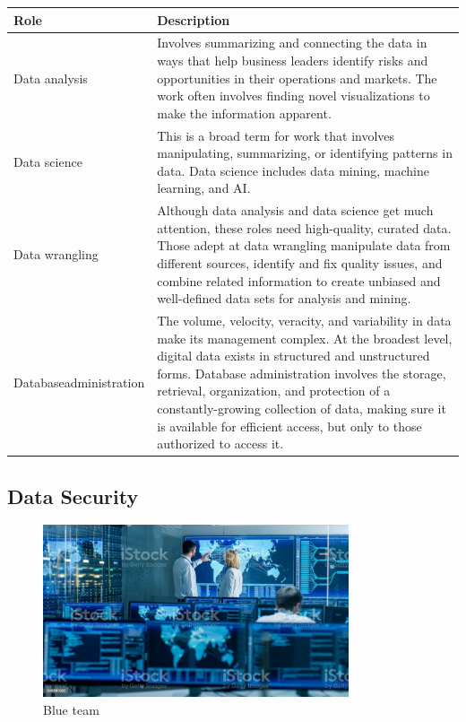 \begin{table}[H]
	\begin{center}
		\begin{tabular}{p{1in}|p{3.4in}} 
			\textbf{Role} & \textbf{Description}\\
			\hline
			Data analysis & Involves summarizing and connecting the data in ways that help business leaders identify risks and opportunities in their operations and markets. The work often involves finding novel visualizations to make the information apparent.\\
			\hline
			Data science & This is a broad term for work that involves manipulating, summarizing, or identifying patterns in data. Data science includes data mining, machine learning, and AI.\\
			\hline
			Data wrangling & Although data analysis and data science get much attention, these roles need high-quality, curated data. Those adept at data wrangling manipulate data from different sources, identify and fix quality issues, and combine related information to create unbiased and well-defined data sets for analysis and mining.\\
			\hline
			Database\linebreak administration & The volume, velocity, veracity, and variability in data make its management complex. At the broadest level, digital data exists in structured and unstructured forms. Database administration involves the storage, retrieval, organization, and protection of a constantly-growing collection of data, making sure it is available for efficient access, but only to those authorized to access it.\\
			\hline
		\end{tabular}
	\end{center}
\end{table}

\subsection{Data Security}

\begin{figure}[H]
	\begin{center}
		\caption{Blue team}
		\vskip 4pt
		\includegraphics[height=2in]{images/careers/istockphoto-949581032-1024x1024.jpg}
	\end{center}
\end{figure}

